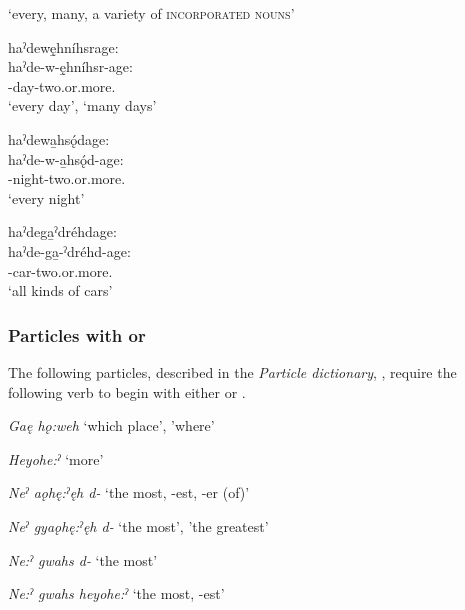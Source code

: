 \ea\label{ex:pppexpressionex5}  ‘every, many, a variety of \textsc{incorporated nouns}’

\ea haˀdewę̱hníhsrage: \\
\gll haˀde-w-ę̱hníhsr-age:\\
{\translocativedualic}-day-two.or.more.{\stative}\\
\glt ‘every day’, `many days'

\ex haˀdewa̱hsǫ́dage:\\
\gll haˀde-w-a̱hsǫ́d-age:\\
{\translocativedualic}-night-two.or.more.{\stative}\\
\glt `every night'

\ex haˀdega̱ˀdréhdage:\\
\gll haˀde-ga̱-ˀdréhd-age:\\
{\translocativedualic}-car-two.or.more.{\stative}\\
\glt `all kinds of cars'
\z
\z

\subsubsection*{Particles with  {\cislocative} or  \textsc{\translocative}} \label{Particles with [d-] (cislocative) or [heˀ-] (translocative)}
The following particles, described in the \textit{Particle dictionary}, , require the following verb to begin with either  {\cislocative} or  {\translocative}.

\begin{CayugaRelated}
\item{}\textit{Gaę hǫ:weh} ‘which place’, 'where’\\
\item{}\textit{Heyohe:ˀ} ‘more’\\
\item{}\textit{Neˀ aǫhę:ˀęh d-} ‘the most, -est, -er (of)’\\
\item{}\textit{Neˀ gyaǫhę:ˀęh d-} ‘the most’, 'the greatest’\\
\item{}\textit{Ne:ˀ gwahs d-} ‘the most’\\
\item{}\textit{Ne:ˀ gwahs heyohe:ˀ} ‘the most, -est’
\end{CayugaRelated}



